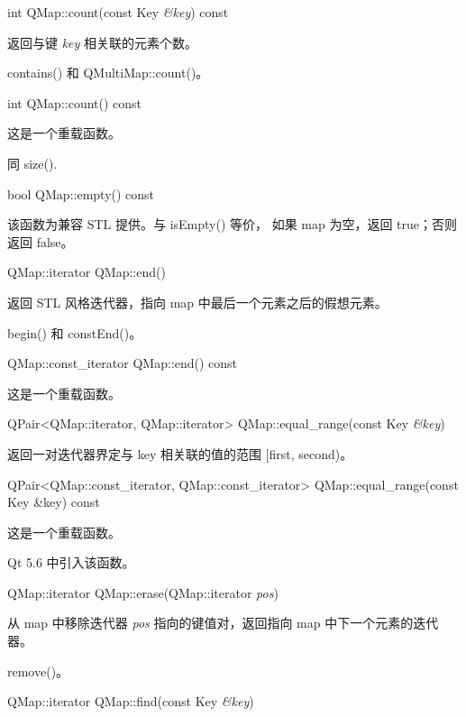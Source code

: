 \splitLine

int QMap::count(const Key \emph{\&key}) const

返回与键 \emph{key} 相关联的元素个数。

\begin{notice}[另请参阅]
contains() 和 QMultiMap::count()。
\end{notice}

\splitLine

int QMap::count() const

这是一个重载函数。

同 size().

\splitLine

bool QMap::empty() const

该函数为兼容 STL 提供。与 isEmpty() 等价，
如果 map 为空，返回 true；否则返回 false。

\splitLine

QMap::iterator QMap::end()

返回 STL 风格迭代器，指向 map 中最后一个元素之后的假想元素。

\begin{notice}[另请参阅]
begin() 和 constEnd()。
\end{notice}

\splitLine

QMap::const\_iterator QMap::end() const

这是一个重载函数。

\splitLine

QPair<QMap::iterator, QMap::iterator> QMap::equal\_range(const Key \emph{\&key})

返回一对迭代器界定与 key 相关联的值的范围 [first, second)。

\splitLine

QPair<QMap::const\_iterator, QMap::const\_iterator> QMap::equal\_range(const Key \&key) const

这是一个重载函数。

Qt 5.6 中引入该函数。

\splitLine

QMap::iterator QMap::erase(QMap::iterator \emph{pos})

从 map 中移除迭代器 \emph{pos} 指向的键值对，返回指向 map 中下一个元素的迭代器。


\begin{notice}[另请参阅]
remove()。
\end{notice}

\splitLine

QMap::iterator QMap::find(const Key \emph{\&key})

